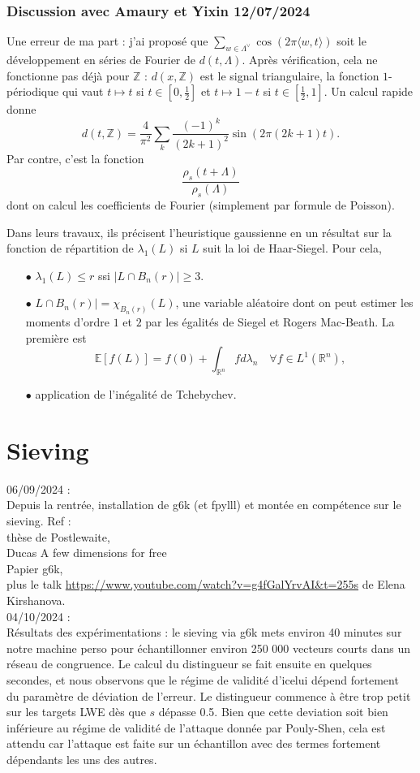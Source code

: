 \documentclass{article}
\begin{document}
\subsubsection{Discussion avec Amaury et Yixin 12/07/2024}
 
Une erreur de ma part : j'ai proposé que $\sum_{w \in\Lambda^\vee} \cos (2\pi\langle w, t\rangle ) $ soit le développement en séries de Fourier de $d(t,\Lambda)$. Après vérification, cela ne fonctionne pas déjà pour $\mathbb Z$ : $d(x,\mathbb Z)$ est le signal triangulaire, la fonction $1$-périodique qui vaut $t\mapsto t$ si $t\in [0,\frac{1}{2}]$ et $t\mapsto 1-t$ si $t\in [\frac{1}{2},1]$. Un calcul rapide donne
\[d(t,\mathbb Z) = \frac{4}{\pi^2} \sum_{k }\frac{(-1)^k}{(2k+1)^2} \sin (2\pi (2k+1)t). \]
Par contre, c'est la fonction 
\[\frac{\rho_s(t+\Lambda)}{\rho_s(\Lambda)}\]
dont on calcul les coefficients de Fourier (simplement par formule de Poisson).    
 
Dans leurs travaux, ils précisent l'heuristique gaussienne en un résultat sur la fonction de répartition de $\lambda_1(L)$ si $L$ suit la loi de Haar-Siegel. Pour cela,
\begin{itemize}
\item[$\bullet$] $\lambda_1(L)\leq r$ ssi $|L\cap B_n(r)|\geq 3$.
\item[$\bullet$] $L\cap B_n(r)| = \chi_{B_n(r)}(L)$, une variable aléatoire dont on peut estimer les moments d'ordre $1$ et $2$ par les égalités de Siegel et Rogers Mac-Beath. La première est
\[\mathbb E[f(L) ] = f(0) + \int_{\mathbb R^n} fd\lambda_n\quad\forall f\in L^1(\mathbb R^n),\] 
\item[$\bullet$] application de l'inégalité de Tchebychev.
\end{itemize}  
\section{Sieving}
 
06/09/2024 : \\
Depuis la rentrée, installation de g6k (et fpylll) et montée en compétence sur le sieving. 
Ref : \\
thèse de Postlewaite, \\
Ducas A few dimensions for free\\
Papier g6k, \\
plus le talk \url{https://www.youtube.com/watch?v=g4fGalYrvAI&t=255s} de Elena Kirshanova.\\

04/10/2024 :\\
Résultats des expérimentations : le sieving via g6k mets environ 40 minutes sur notre machine perso pour échantillonner environ 250 000 vecteurs courts dans un réseau de congruence. Le calcul du distingueur se fait ensuite en quelques secondes, et nous observons que le régime de validité d'icelui dépend fortement du paramètre de déviation de l'erreur. Le distingueur commence à être trop petit sur les targets LWE dès que $s$ dépasse 0.5. Bien que cette deviation soit bien inférieure au régime de validité de l'attaque donnée par Pouly-Shen, cela est attendu car l'attaque est faite sur un échantillon avec des termes fortement dépendants les uns des autres.\\
\end{document}

